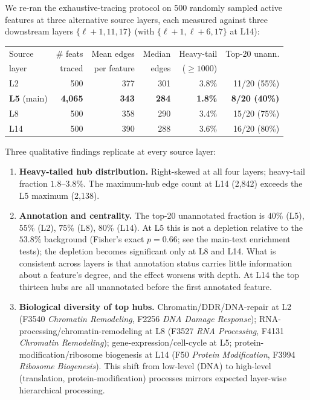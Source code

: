 \documentclass[10pt,letterpaper]{article}
\begin{document}
We re-ran the exhaustive-tracing protocol on 500 randomly sampled active features at three alternative source layers, each measured against three downstream layers $\{\ell+1, 11, 17\}$ (with $\{\ell+1, \ell+6, 17\}$ at L14):

\begin{center}
\begin{tabular}{lrrrrr}
\toprule
Source & \# feats & Mean edges & Median & Heavy-tail & Top-20 unann. \\
layer & traced & per feature & edges & ($\geq 1000$) & \\
\midrule
L2  & 500 & 377 & 301 & 3.8\% & 11/20 (55\%) \\
\textbf{L5} (main) & \textbf{4{,}065} & \textbf{343} & \textbf{284} & \textbf{1.8\%} & \textbf{8/20 (40\%)} \\
L8  & 500 & 358 & 290 & 3.4\% & 15/20 (75\%) \\
L14 & 500 & 390 & 288 & 3.6\% & 16/20 (80\%) \\
\bottomrule
\end{tabular}
\end{center}

Three qualitative findings replicate at every source layer:
\begin{enumerate}
\item \textbf{Heavy-tailed hub distribution.} Right-skewed at all four layers; heavy-tail fraction $1.8$--$3.8\%$. The maximum-hub edge count at L14 (2{,}842) exceeds the L5 maximum (2{,}138).
\item \textbf{Annotation and centrality.} The top-20 unannotated fraction is $40\%$ (L5), $55\%$ (L2), $75\%$ (L8), $80\%$ (L14). At L5 this is not a depletion relative to the $53.8\%$ background (Fisher's exact $p=0.66$; see the main-text enrichment tests); the depletion becomes significant only at L8 and L14. What is consistent across layers is that annotation status carries little information about a feature's degree, and the effect worsens with depth. At L14 the top thirteen hubs are all unannotated before the first annotated feature.
\item \textbf{Biological diversity of top hubs.} Chromatin/DDR/DNA-repair at L2 (F3540 \emph{Chromatin Remodeling}, F2256 \emph{DNA Damage Response}); RNA-processing/chromatin-remodeling at L8 (F3527 \emph{RNA Processing}, F4131 \emph{Chromatin Remodeling}); gene-expression/cell-cycle at L5; protein-modification/ribosome biogenesis at L14 (F50 \emph{Protein Modification}, F3994 \emph{Ribosome Biogenesis}). This shift from low-level (DNA) to high-level (translation, protein-modification) processes mirrors expected layer-wise hierarchical processing.
\end{enumerate}
\end{document}
